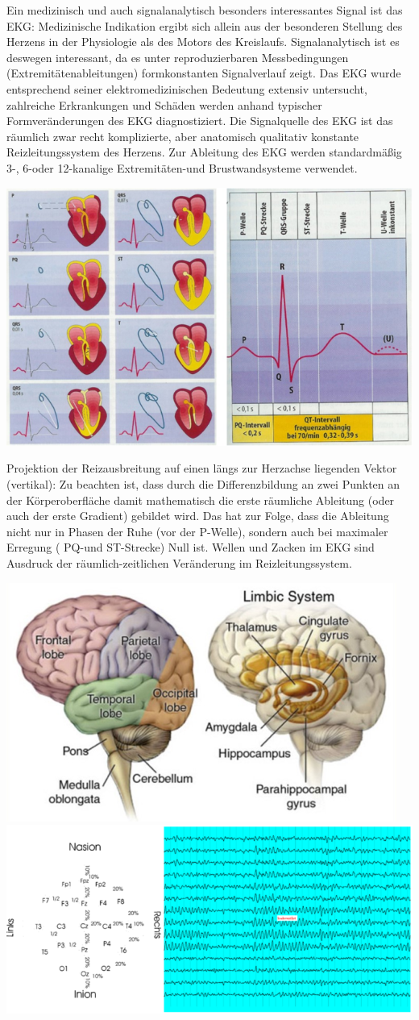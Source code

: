 \documentclass[a4paper]{article}
\begin{document}
\begin{multicols}{3}
  Ein medizinisch und auch signalanalytisch besonders interessantes Signal
  ist das EKG: Medizinische Indikation ergibt sich allein aus der
  besonderen Stellung des Herzens in der Physiologie als des Motors des
  Kreislaufs. Signalanalytisch ist es deswegen interessant, da es unter
  reproduzierbaren Messbedingungen (Extremitätenableitungen)
  formkonstanten Signalverlauf zeigt. Das EKG wurde entsprechend seiner
  elektromedizinischen Bedeutung extensiv untersucht, zahlreiche
  Erkrankungen und Schäden werden anhand typischer Formveränderungen des
  EKG diagnostiziert. Die Signalquelle des EKG ist das räumlich zwar recht
  komplizierte, aber anatomisch qualitativ konstante Reizleitungssystem
  des Herzens. Zur Ableitung des EKG werden standardmäßig 3-, 6-oder
  12-kanalige Extremitäten-und Brustwandsysteme verwendet.

  \includegraphics[width=.5\linewidth]{Assets/Biosignalverarbeitung-herz-ekg.png}

  Projektion der Reizausbreitung auf einen längs zur Herzachse liegenden
  Vektor (vertikal): Zu beachten ist, dass durch die Differenzbildung an
  zwei Punkten an der Körperoberfläche damit mathematisch die erste
  räumliche Ableitung (oder auch der erste Gradient) gebildet wird. Das
  hat zur Folge, dass die Ableitung nicht nur in Phasen der Ruhe (vor der
  P-Welle), sondern auch bei maximaler Erregung ( PQ-und ST-Strecke) Null
  ist. Wellen und Zacken im EKG sind Ausdruck der räumlich-zeitlichen
  Veränderung im Reizleitungssystem.

  \includegraphics[width=.5\linewidth]{Assets/Biosignalverarbeitung-gehirn.png}
  \includegraphics[width=.5\linewidth]{Assets/Biosignalverarbeitung-gehirn-ekg.png}


\end{multicols}
\end{document}
